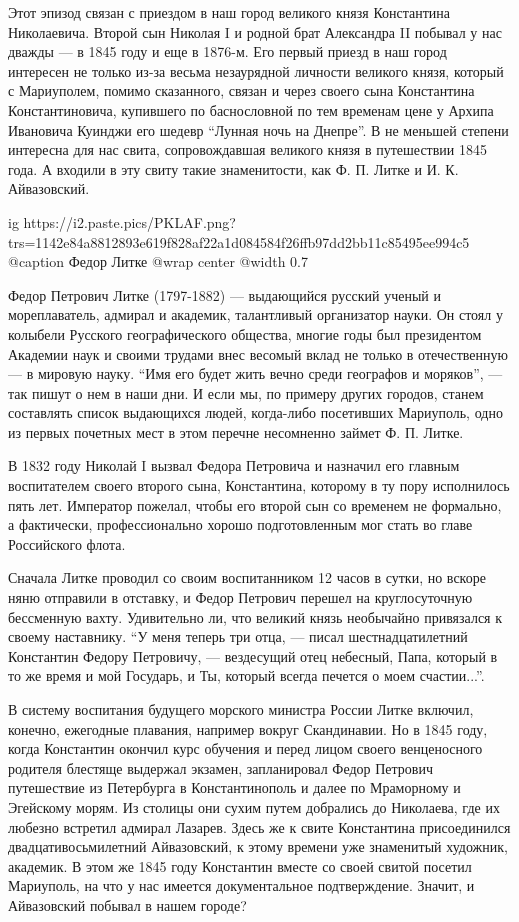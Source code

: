 Этот эпизод связан с приездом в наш город великого князя Константина
Николаевича. Второй сын Николая I и родной брат Александра II побывал у нас
дважды — в 1845 году и еще в 1876-м. Его первый приезд в наш город интересен не
только из-за весьма незаурядной личности великого князя, который с Мариуполем,
помимо сказанного, связан и через своего сына Константина Константиновича,
купившего по баснословной по тем временам цене у Архипа Ивановича Куинджи его
шедевр \enquote{Лунная ночь на Днепре}. В не меньшей степени интересна для нас свита,
сопровождавшая великого князя в путешествии 1845 года. А входили в эту свиту
такие знаменитости, как Ф. П. Литке и И. К. Айвазовский.

\ifcmt
  ig https://i2.paste.pics/PKLAF.png?trs=1142e84a8812893e619f828af22a1d084584f26ffb97dd2bb11c85495ee994c5
	@caption Федор Литке
  @wrap center
  @width 0.7
\fi

Федор Петрович Литке (1797-1882) — выдающийся русский ученый и мореплаватель,
адмирал и академик, талантливый организатор науки. Он стоял у колыбели Русского
геогра­фического общества, многие годы был президентом Академии наук и своими
трудами внес весомый вклад не только в отечественную — в мировую науку. \enquote{Имя
его будет жить вечно среди географов и моряков}, — так пишут о нем в наши дни.
И если мы, по примеру других городов, станем составлять список выдающихся
людей, когда-либо посетивших Мариуполь, одно из первых почетных мест в этом
перечне несомненно займет Ф. П. Литке.

В 1832 году Николай I вызвал Федора Петровича и назначил его главным
воспитателем своего второго сына, Константина, которому в ту пору исполнилось
пять лет. Император пожелал, чтобы его второй сын со временем не формально, а
фактически, профессионально хорошо подготовленным мог стать во главе
Российского флота.

Сначала Литке проводил со своим воспитанником 12 часов в сутки, но вскоре няню
отправили в отставку, и Федор Петрович перешел на круглосуточную бессменную
вахту. Удивительно ли, что великий князь необычайно привязался к своему
наставнику. \enquote{У меня теперь три отца, — писал шестнадцатилетний Константин
Федору Петровичу, — вездесущий отец небесный, Папа, который в то же время и мой
Государь, и Ты, который всегда печется о моем счастии...}.

В систему воспитания будущего морского министра России Литке включил, конечно,
ежегодные плавания, например вокруг Скандинавии. Но в 1845 году, когда
Константин окончил курс обучения и перед лицом своего венценосного родителя
блестяще выдержал экзамен, запланировал Федор Петрович путешествие из
Петербурга в Константинополь и далее по Мраморному и Эгейскому морям. Из
столицы они сухим путем добрались до Николаева, где их любезно встретил
адмирал Лазарев. Здесь же к свите Константина присое­динился
двадцативосьмилетний Айвазовский, к этому времени уже знаменитый художник,
академик. В этом же 1845 году Константин вместе со своей свитой посетил
Мариу­поль, на что у нас имеется документальное подтверждение. Значит, и
Айвазовский побывал в нашем городе?

